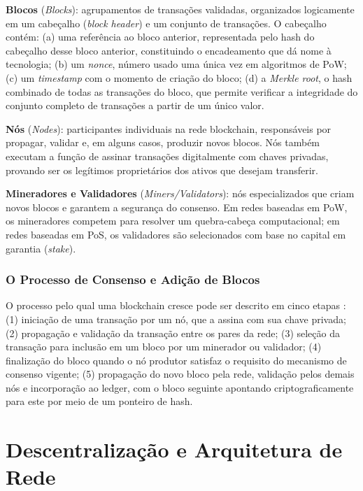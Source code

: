 \documentclass[12pt,a4paper]{report}
\begin{document}
\textbf{Blocos} (\textit{Blocks}): agrupamentos de transações validadas, organizados logicamente em um cabeçalho (\textit{block header}) e um conjunto de transações. O cabeçalho contém: (a) uma referência ao bloco anterior, representada pelo hash do cabeçalho desse bloco anterior, constituindo o encadeamento que dá nome à tecnologia; (b) um \textit{nonce}, número usado uma única vez em algoritmos de PoW; (c) um \textit{timestamp} com o momento de criação do bloco; (d) a \textit{Merkle root}, o hash combinado de todas as transações do bloco, que permite verificar a integridade do conjunto completo de transações a partir de um único valor.

\textbf{Nós} (\textit{Nodes}): participantes individuais na rede blockchain, responsáveis por propagar, validar e, em alguns casos, produzir novos blocos. Nós também executam a função de assinar transações digitalmente com chaves privadas, provando ser os legítimos proprietários dos ativos que desejam transferir.

\textbf{Mineradores e Validadores} (\textit{Miners/Validators}): nós especializados que criam novos blocos e garantem a segurança do consenso. Em redes baseadas em PoW, os mineradores competem para resolver um quebra-cabeça computacional; em redes baseadas em PoS, os validadores são selecionados com base no capital em garantia (\textit{stake}).

\subsection{O Processo de Consenso e Adição de Blocos}

O processo pelo qual uma blockchain cresce pode ser descrito em cinco etapas \cite{Bashir2023}: (1) iniciação de uma transação por um nó, que a assina com sua chave privada; (2) propagação e validação da transação entre os pares da rede; (3) seleção da transação para inclusão em um bloco por um minerador ou validador; (4) finalização do bloco quando o nó produtor satisfaz o requisito do mecanismo de consenso vigente; (5) propagação do novo bloco pela rede, validação pelos demais nós e incorporação ao ledger, com o bloco seguinte apontando criptograficamente para este por meio de um ponteiro de hash.

\chapter{Descentralização e Arquitetura de Rede}
\end{document}
